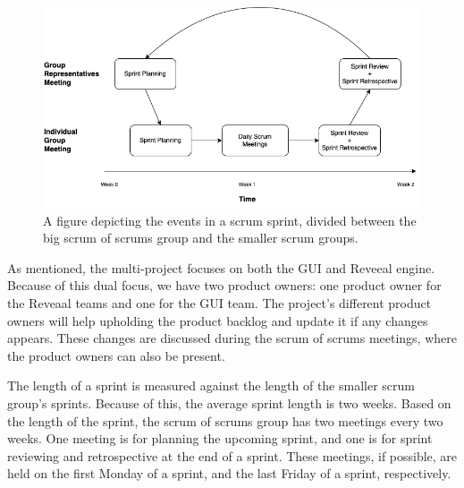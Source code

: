\begin{figure}[H]
    \centering
    \includegraphics[width=\textwidth]{common/figures/Scrum_of_scrums_schedule.png}
    \caption{A figure depicting the events in a scrum sprint, divided between the big scrum of scrums group and the smaller scrum groups.}
    \label{fig:scrum-of-scrums-events}
\end{figure}


As mentioned, the multi-project focuses on both the GUI and Reveeal engine.
Because of this dual focus, we have two product owners: one product owner for the Reveaal teams and one for the GUI team.
The project's different product owners will help upholding the product backlog and update it if any changes appears. 
These changes are discussed during the scrum of scrums meetings, where the product owners can also be present.

The length of a sprint is measured against the length of the smaller scrum group's sprints.
Because of this, the average sprint length is two weeks.
Based on the length of the sprint, the scrum of scrums group has two meetings every two weeks. 
One meeting is for planning the upcoming sprint, and one is for sprint reviewing and retrospective at the end of a sprint.
These meetings, if possible, are held on the first Monday of a sprint, and the last Friday of a sprint, respectively.




